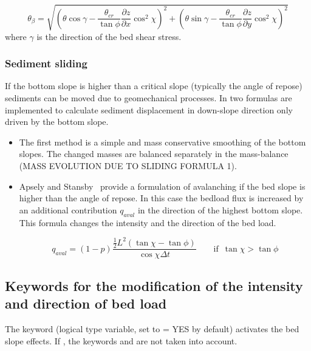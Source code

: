 \begin{itemize}
\begin{equation*}
\theta_{\beta} = \sqrt{\left( \theta \cos\gamma - \frac{\theta_{cr}}{\tan\phi} \frac{\partial z}{\partial x} \cos^2 \chi \right)^2 +
\left(\theta \sin\gamma - \frac{\theta_{cr} }{\tan\phi} \frac{\partial z}{\partial y} \cos^2 \chi \right)^2 }
\end{equation*}
where $\gamma$ is the direction of the bed shear stress.
\end{itemize}



\subsubsection{Sediment sliding}
If the bottom slope is higher than a critical slope (typically the angle of repose) sediments can be moved due to geomechanical processes. In \gaia{} two formulas are implemented to calculate sediment displacement in down-slope direction only driven by the bottom slope.
\begin{itemize}

\item The first method is a simple and mass conservative smoothing of the bottom slopes. The changed masses are balanced separately in the mass-balance (MASS EVOLUTION DUE TO SLIDING FORMULA 1).

\item Apsely and Stansby~\cite{ApsleyStansby2008} provide a formulation of avalanching if the bed slope is higher than the angle of repose. In this case the bedload flux  is increased by an additional contribution $q_{aval}$ in the direction of the highest bottom slope. This formula changes the intensity and the direction of the bed load.

\begin{equation*}
q_{aval} = (1-p)\frac{\frac{1}{2} L^2 (\tan\chi - \tan\phi)}{\cos\chi \Delta t}\qquad  \textrm{if} \enspace \tan\chi> \tan\phi
\end{equation*}
\end{itemize}
\subsection{Keywords for the modification of the intensity and direction of bed load}
The keyword  (logical type variable, set to {\ttfamily = YES} by default) activates the bed slope effects. If , the keywords  and  are not taken into account.

